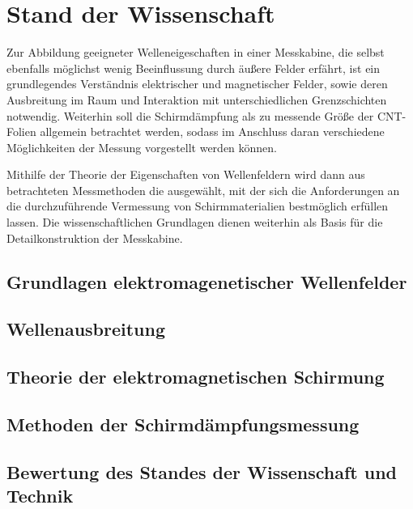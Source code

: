 

\chapter{Stand der Wissenschaft}\label{cha:2}

Zur Abbildung geeigneter Welleneigeschaften in einer Messkabine, die selbst ebenfalls möglichst wenig Beeinflussung durch äußere Felder erfährt, ist ein grundlegendes Verständnis elektrischer und magnetischer Felder, sowie deren Ausbreitung im Raum und Interaktion mit unterschiedlichen Grenzschichten notwendig. Weiterhin soll die Schirmdämpfung als zu messende Größe der CNT-Folien allgemein betrachtet werden, sodass im Anschluss daran verschiedene Möglichkeiten der Messung vorgestellt werden können. \par
\vspace{\linespace}
Mithilfe der Theorie der Eigenschaften von Wellenfeldern wird dann aus betrachteten Messmethoden die ausgewählt, mit der sich die Anforderungen an die durchzuführende Vermessung von Schirm\-materialien bestmöglich erfüllen lassen. Die wissenschaftlichen Grundlagen dienen weiterhin als Basis für die Detailkonstruktion der Messkabine.


\section{Grundlagen elektromagenetischer Wellenfelder}\label{cha:2_Grundlagen}




\section{Wellenausbreitung}\label{cha:2_Wellenausbreitung}




\section{Theorie der elektromagnetischen Schirmung}\label{cha:2_Theorie_der_elektromagnetischen_Schirmung}





\section{Methoden der Schirmdämpfungsmessung}\label{cha:2_Methoden_der_Schirmdaempfungsmessung}




\section{Bewertung des Standes der Wissenschaft und Technik}\label{cha:2_Bewertung_Stand_der_Technik}

